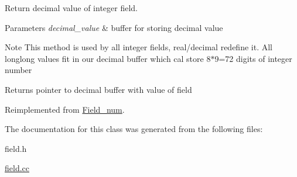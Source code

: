 Return decimal value of integer field.


\begin{DoxyParams}{Parameters}
{\em decimal\+\_\+value} & buffer for storing decimal value\\
\hline
\end{DoxyParams}
\begin{DoxyNote}{Note}
This method is used by all integer fields, real/decimal redefine it. All longlong values fit in our decimal buffer which cal store 8$\ast$9=72 digits of integer number
\end{DoxyNote}
\begin{DoxyReturn}{Returns}
pointer to decimal buffer with value of field 
\end{DoxyReturn}


Reimplemented from \mbox{\hyperlink{classField__num_a6fec8b8c9fc5c0b9b0429f6fbc860de3}{Field\+\_\+num}}.



The documentation for this class was generated from the following files\+:\begin{DoxyCompactItemize}
\item 
field.\+h\item 
\mbox{\hyperlink{field_8cc}{field.\+cc}}\end{DoxyCompactItemize}
